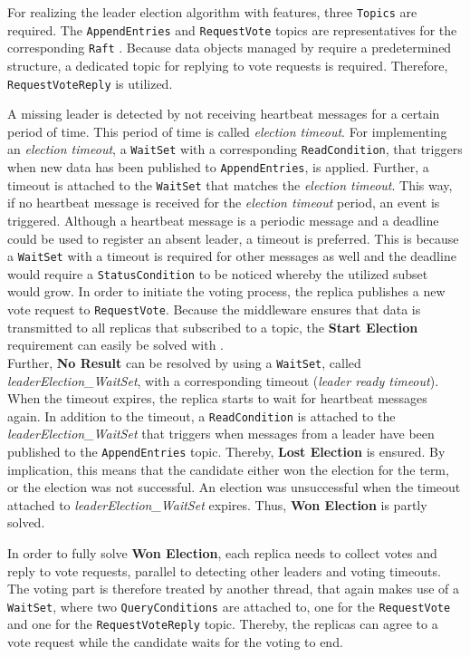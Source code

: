 For realizing the leader election algorithm with  features, three \texttt{Topics} are required.
The \texttt{AppendEntries} and \texttt{RequestVote} topics are representatives for the corresponding \texttt{Raft} .
Because data objects managed by  require a predetermined structure, a dedicated topic for replying to vote requests is required.
Therefore, \texttt{RequestVoteReply} is utilized.

A missing leader is detected by not receiving heartbeat messages for a certain period of time.
This period of time is called \textit{election timeout}.
For implementing an \textit{election timeout}, a \texttt{WaitSet} with a corresponding \texttt{ReadCondition}, that triggers when new data has been published to \texttt{AppendEntries}, is applied.
Further, a timeout is attached to the \texttt{WaitSet} that matches the \textit{election timeout}.
This way, if no heartbeat message is received for the \textit{election timeout} period, an event is triggered.
Although a heartbeat message is a periodic message and a deadline  could be used to register an absent leader, a timeout is preferred.
This is because a \texttt{WaitSet} with a timeout is required for other messages as well and the deadline  would require a \texttt{StatusCondition} to be noticed whereby the utilized  subset would grow.
In order to initiate the voting process, the replica publishes a new vote request to \texttt{RequestVote}.
Because the middleware ensures that data is transmitted to all replicas that subscribed to a topic, the \textbf{Start Election} requirement can easily be solved with .
\\

Further, \textbf{No Result} can be resolved by using a \texttt{WaitSet}, called \textit{leaderElection\_WaitSet}, with a corresponding timeout (\textit{leader ready timeout}).
When the timeout expires, the replica starts to wait for heartbeat messages again.
In addition to the timeout, a \texttt{ReadCondition} is attached to the \textit{leaderElection\_WaitSet} that triggers when messages from a leader have been published to the \texttt{AppendEntries} topic.
Thereby, \textbf{Lost Election} is ensured.
By implication, this means that the candidate either won the election for the term, or the election was not successful.
An election was unsuccessful when the timeout attached to \textit{leaderElection\_WaitSet} expires.
Thus, \textbf{Won Election} is partly solved.

In order to fully solve \textbf{Won Election}, each replica needs to collect votes and reply to vote requests, parallel to detecting other leaders and voting timeouts.
The voting part is therefore treated by another  thread, that again makes use of a \texttt{WaitSet}, where two \texttt{QueryConditions} are attached to, one for the \texttt{RequestVote} and one for the \texttt{RequestVoteReply} topic.
Thereby, the replicas can agree to a vote request while the candidate waits for the voting to end.

